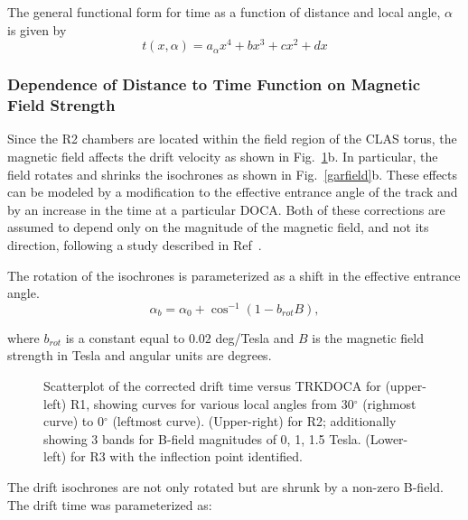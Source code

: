 The general functional form for time as a function of distance and local angle, $\alpha$
is given by
\begin{equation}
\label{tfunctionofxandlocalangle}
t(x,\alpha) = a_{\alpha} x^4 + b x^3 + c x^2 + d x
\end{equation}

\subsubsection{Dependence of Distance to Time Function on Magnetic Field Strength}
Since the R2 chambers are located within the field region of the CLAS torus, the 
magnetic field affects the drift velocity as shown in 
Fig.~\ref{xvst}b.  In particular, the field rotates and shrinks the isochrones
as shown in Fig.~\ref{garfield}b.  These effects can be modeled by a 
modification to the effective entrance angle of the track and by an increase 
in the time at a particular DOCA.  Both of these corrections are assumed to depend only on the 
magnitude of the magnetic field, and not its direction, following a study 
described in Ref~\cite{MM-IEEE}.  

The rotation of the isochrones is parameterized as a shift in the effective
entrance angle.  
\begin{equation} 
\label{eq-bcorrn-to-ang}
\alpha_b = \alpha_0 + \cos^{-1}(1 - b_{rot} B), 
\end{equation}

where $b_{rot}$ is a constant equal to $0.02$ deg/Tesla and $B$ is the magnetic field strength in Tesla and angular
units are degrees.

\begin{figure}[htb]
\vspace{15.cm} 
\caption{\small{Scatterplot of the corrected drift time versus TRKDOCA for 
(upper-left) R1, showing curves for various local angles from 30$^{\circ}$
(righmost curve) to 0$^{\circ}$ (leftmost curve).  (Upper-right) for R2; 
additionally showing 3 bands for B-field magnitudes of 0, 1, 1.5 Tesla.
(Lower-left) for R3 with the inflection point identified.}}
\label{xvst}
\end{figure}



The drift isochrones are not only rotated but are shrunk by a non-zero B-field.
The drift time was parameterized as:


